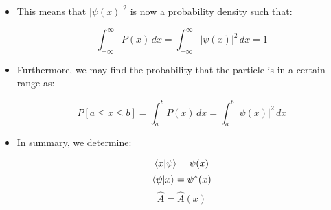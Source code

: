 \begin{itemize}
\begin{itemize}
\begin{itemize}
          \item This means that $|\psi(x)|^2$ is now a probability density such that:

            $$\int_{-\infty}^{\infty}P(x)\,dx=\int_{-\infty}^{\infty}|\psi(x)|^2\,dx=1$$

          \item Furthermore, we may find the probability that the particle is in a certain range as:

            $$P[a\leq x\leq b]=\int_{a}^{b}P(x)\,dx=\int_{a}^{b}|\psi(x)|^2\,dx$$

          \item In summary, we determine:

            $$\bra{x}\ket{\psi}=\psi(x)$$
            $$\bra{\psi}\ket{x}=\psi^*(x)$$
            $$\hat{A}=\hat{A}(x)$$

        \end{itemize}

    \end{itemize}

\end{itemize}



